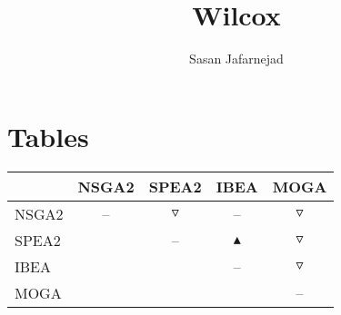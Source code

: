 \documentclass{article}
\title{Wilcox}
\author{Sasan Jafarnejad}
\begin{document}
 \maketitle
 \section{Tables}
 \begin{table}
 \centering \begin{tabular}{l c c c c }
  \hline & NSGA2 & SPEA2 & IBEA & MOGA \\
 \hline  NSGA2 &  --  & $\triangledown$ &  --  & $\triangledown$ \\
  SPEA2 &   &  --  & $\blacktriangle$ & $\triangledown$ \\
  IBEA &   &   &  --  & $\triangledown$ \\
  MOGA &   &   &   &  --  \\
 \hline
 \end{tabular}
 \end{table}
 
\end{document}
